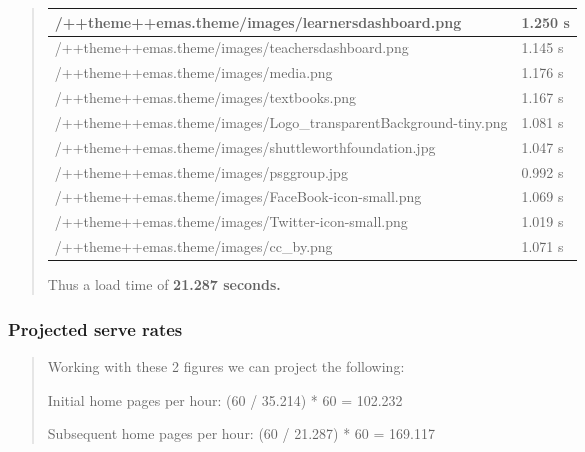 \documentclass[letterpaper,10pt,english]{sphinxmanual}
\begin{document}
\begin{quote}
\begin{tabulary}{\linewidth}{|L|L|}
/++theme++emas.theme/images/learnersdashboard.png
 & 
1.250 s
\\\hline

/++theme++emas.theme/images/teachersdashboard.png
 & 
1.145 s
\\\hline

/++theme++emas.theme/images/media.png
 & 
1.176 s
\\\hline

/++theme++emas.theme/images/textbooks.png
 & 
1.167 s
\\\hline

/++theme++emas.theme/images/Logo\_transparentBackground-tiny.png
 & 
1.081 s
\\\hline

/++theme++emas.theme/images/shuttleworthfoundation.jpg
 & 
1.047 s
\\\hline

/++theme++emas.theme/images/psggroup.jpg
 & 
0.992 s
\\\hline

/++theme++emas.theme/images/FaceBook-icon-small.png
 & 
1.069 s
\\\hline

/++theme++emas.theme/images/Twitter-icon-small.png
 & 
1.019 s
\\\hline

/++theme++emas.theme/images/cc\_by.png
 & 
1.071 s
\\\hline
\end{tabulary}


Thus a load time of \textbf{21.287 seconds.}
\end{quote}


\subsubsection{Projected serve rates}
\label{index:projected-serve-rates}\begin{quote}

Working with these 2 figures we can project the following:

Initial home pages per hour:
(60 / 35.214) * 60 = 102.232

Subsequent home pages per hour:
(60 / 21.287) * 60 = 169.117
\end{quote}
\end{document}
